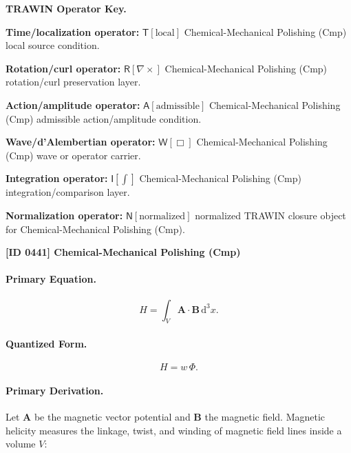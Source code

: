 \par\vspace{0.45\baselineskip}
\noindent\begin{minipage}[t]{\linewidth}
\begingroup
\small
\raggedright
\textbf{TRAWIN Operator Key.}\par
\noindent\textbf{Time/localization operator:} $\mathsf{T}\!\left[\mathrm{local}\right]$ Chemical-Mechanical Polishing (Cmp) local source condition.\par
\noindent\textbf{Rotation/curl operator:} $\mathsf{R}\!\left[\nabla\times\right]$ Chemical-Mechanical Polishing (Cmp) rotation/curl preservation layer.\par
\noindent\textbf{Action/amplitude operator:} $\mathsf{A}\!\left[\mathrm{admissible}\right]$ Chemical-Mechanical Polishing (Cmp) admissible action/amplitude condition.\par
\noindent\textbf{Wave/d'Alembertian operator:} $\mathsf{W}\!\left[\Box\right]$ Chemical-Mechanical Polishing (Cmp) wave or operator carrier.\par
\noindent\textbf{Integration operator:} $\mathsf{I}\!\left[\int\right]$ Chemical-Mechanical Polishing (Cmp) integration/comparison layer.\par
\noindent\textbf{Normalization operator:} $\mathsf{N}\!\left[\mathrm{normalized}\right]$ normalized TRAWIN closure object for Chemical-Mechanical Polishing (Cmp).\par
\endgroup
\end{minipage}

\clearpage
\noindent\textbf{[ID 0441] Chemical-Mechanical Polishing (Cmp)}\par
\vspace{0.35em}
\paragraph{Primary Equation.}
\begin{equation}
H
=
\int_V
\mathbf{A}\cdot\mathbf{B}
\,\mathrm{d}^3x .
\end{equation}

\paragraph{Quantized Form.}
\begin{equation}
H=w\,\Phi .
\end{equation}

\paragraph{Primary Derivation.}
Let $\mathbf{A}$ be the magnetic vector potential and $\mathbf{B}$ the magnetic field.  
Magnetic helicity measures the linkage, twist, and winding of magnetic field lines inside a volume $V$:

